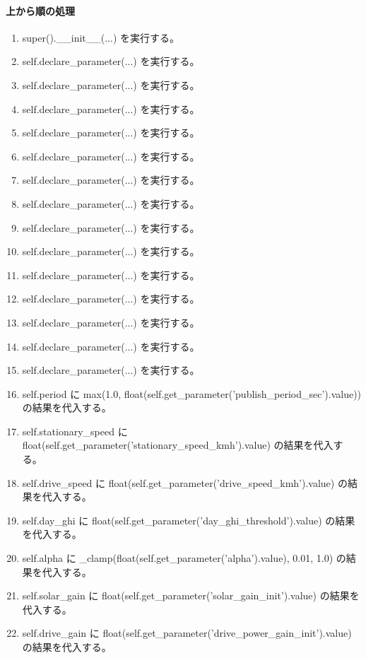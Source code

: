 \documentclass[a4paper,11pt]{article}
\begin{document}
            \paragraph{上から順の処理}
            \begin{enumerate}[leftmargin=1.8em]
            \item super().\_\_init\_\_(...) を実行する。
\item self.declare\_parameter(...) を実行する。
\item self.declare\_parameter(...) を実行する。
\item self.declare\_parameter(...) を実行する。
\item self.declare\_parameter(...) を実行する。
\item self.declare\_parameter(...) を実行する。
\item self.declare\_parameter(...) を実行する。
\item self.declare\_parameter(...) を実行する。
\item self.declare\_parameter(...) を実行する。
\item self.declare\_parameter(...) を実行する。
\item self.declare\_parameter(...) を実行する。
\item self.declare\_parameter(...) を実行する。
\item self.declare\_parameter(...) を実行する。
\item self.declare\_parameter(...) を実行する。
\item self.declare\_parameter(...) を実行する。
\item self.period に max(1.0, float(self.get\_parameter('publish\_period\_sec').value)) の結果を代入する。
\item self.stationary\_speed に float(self.get\_parameter('stationary\_speed\_kmh').value) の結果を代入する。
\item self.drive\_speed に float(self.get\_parameter('drive\_speed\_kmh').value) の結果を代入する。
\item self.day\_ghi に float(self.get\_parameter('day\_ghi\_threshold').value) の結果を代入する。
\item self.alpha に \_clamp(float(self.get\_parameter('alpha').value), 0.01, 1.0) の結果を代入する。
\item self.solar\_gain に float(self.get\_parameter('solar\_gain\_init').value) の結果を代入する。
\item self.drive\_gain に float(self.get\_parameter('drive\_power\_gain\_init').value) の結果を代入する。

\end{enumerate}
\end{document}
